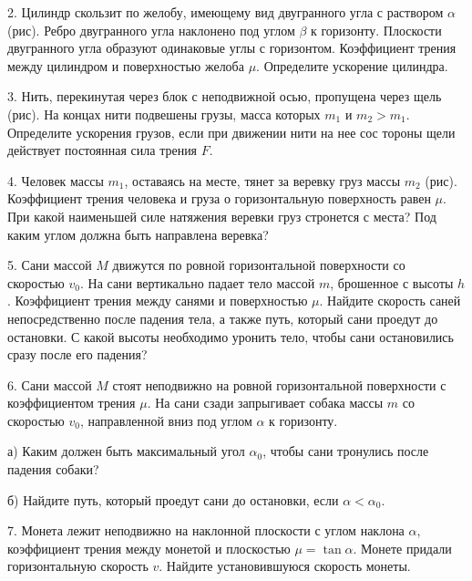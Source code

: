 \documentclass[14pt]{article}
\begin{document}
2. Цилиндр скользит по желобу, имеющему вид двугранного угла с раствором $\alpha$ (рис). Ребро двугранного угла наклонено под углом $\beta$ к горизонту. Плоскости двугранного угла образуют одинаковые углы с горизонтом. Коэффициент трения между цилиндром и поверхностью желоба $\mu$. Определите ускорение цилиндра.

3. Нить, перекинутая через блок с неподвижной осью, пропущена через щель (рис). На концах нити подвешены грузы, масса которых $m_1$ и $m_2>m_1$. Определите ускорения грузов, если при движении нити на нее сос тороны щели действует постоянная сила трения $F$.

4. Человек массы $m_1$, оставаясь на месте, тянет за веревку груз массы $m_2$ (рис). Коэффициент трения человека и груза о горизонтальную поверхность равен $\mu$. При какой наименьшей силе натяжения веревки груз стронется с места? Под каким углом должна быть направлена веревка?

5. Сани массой $M$ движутся по ровной горизонтальной поверхности со скоростью $v_0$. На сани вертикально падает тело массой $m$, брошенное с высоты $h$. Коэффициент трения между санями и поверхностью $\mu$. Найдите скорость саней непосредственно после падения тела, а также путь, который сани проедут до остановки. С какой высоты необходимо уронить тело, чтобы сани остановились сразу после его падения?

6. Сани массой $M$ стоят неподвижно на ровной горизонтальной поверхности с коэффициентом трения $\mu$. На сани сзади запрыгивает собака массы $m$ со скоростью $v_0$, направленной вниз под углом $\alpha$ к горизонту.

а) Каким должен быть максимальный угол $\alpha_0$, чтобы сани тронулись после падения собаки?

б) Найдите путь, который проедут сани до остановки, если $\alpha<\alpha_0$.

7. Монета лежит неподвижно на наклонной плоскости с углом наклона $\alpha$, коэффициент трения между монетой и плоскостью $\mu=\tan\alpha$. Монете придали горизонтальную скорость $v$. Найдите установившуюся скорость монеты.
\end{document}
